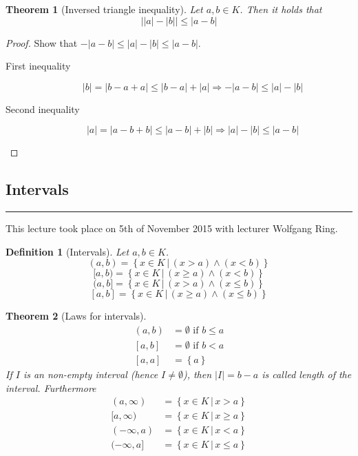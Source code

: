 \documentclass[a4paper,landscape,twocolumn]{article}
\newtheorem{theorem}{Theorem}
\newtheorem{defi}{Definition}
\newcommand\set[1]{\left\{#1\right\}}
\newcommand\setdef[2]{\left\{#1\,|\,#2\right\}}
\newcommand\abs[1]{\left|#1\right|}
\newcommand\meta[3]{\hrule{} This #1 took place on #2 with lecturer #3.\par}
\begin{document}
\begin{theorem}[Inversed triangle inequality]
  Let $a, b \in K$. Then it holds that
  \[ \abs{\abs{a} - \abs{b}} \leq \abs{a - b} \]
\end{theorem}

\begin{proof}
  Show that $-\abs{a - b} \leq \abs{a} - \abs{b} \leq \abs{a - b}$.
  \begin{description}
    \item[First inequality]
      \[ \abs{b} = \abs{b - a + a} \leq \abs{b - a} + \abs{a} \Rightarrow -\abs{a - b} \leq \abs{a} - \abs{b} \]
    \item[Second inequality]
      \[ \abs{a} = \abs{a - b + b} \leq \abs{a - b} + \abs{b} \Rightarrow \abs{a} - \abs{b} \leq \abs{a - b} \]
  \end{description}
\end{proof}

\subsection{Intervals}
\meta{lecture}{5th of November 2015}{Wolfgang Ring}

\begin{defi}[Intervals]
  Let $a, b \in K$.
  \[ (a,b) = \setdef{x \in K}{(x > a) \land (x < b)} \]
  \[ [a, b) = \setdef{x \in K}{(x \geq a) \land (x < b)} \]
  \[ (a, b] = \setdef{x \in K}{(x > a) \land (x \leq b)} \]
  \[ [a, b] = \setdef{x \in K}{(x \geq a) \land (x \leq b)} \]
\end{defi}


\begin{theorem}[Laws for intervals]
  \begin{align}
    (a, b) &= \emptyset \text{ if } b \leq a \\
    [a, b] &= \emptyset \text{ if } b < a \\
    [a, a] &= \set{a}
  \end{align}
  If $I$ is an non-empty interval (hence $I \neq \emptyset$),
  then $\abs{I} = b - a$ is called \emph{length of the interval}.
  Furthermore
  \begin{align}
    (a, \infty) &= \setdef{x \in K}{x > a} \\
    [a, \infty) &= \setdef{x \in K}{x \geq a} \\
    (-\infty, a) &= \setdef{x \in K}{x < a} \\
    (-\infty, a] &= \setdef{x \in K}{x \leq a}
  \end{align}
\end{theorem}
\end{document}
